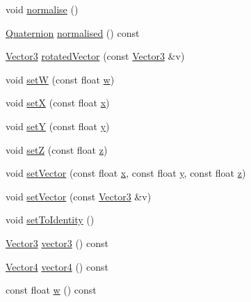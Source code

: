\begin{DoxyCompactItemize}
\item 
void \hyperlink{classprism_1_1_quaternion_adce2473719f015c5e8def79cacf4a37c}{normalise} ()
\item 
\hyperlink{classprism_1_1_quaternion}{Quaternion} \hyperlink{classprism_1_1_quaternion_ac9e4890f0614242dbcf2162b23dc483c}{normalised} () const 
\item 
\hyperlink{classprism_1_1_vector3}{Vector3} \hyperlink{classprism_1_1_quaternion_a042b07658410ce868af8ede1cab913b7}{rotated\+Vector} (const \hyperlink{classprism_1_1_vector3}{Vector3} \&v)
\item 
void \hyperlink{classprism_1_1_quaternion_ae639779c2c76874f1d2b3f04aa93f103}{setW} (const float \hyperlink{classprism_1_1_quaternion_aa930b57c8fbba2855722e82080a23cce}{w})
\item 
void \hyperlink{classprism_1_1_quaternion_a66751ee34eab5f4c77e51c018a0001ff}{setX} (const float \hyperlink{classprism_1_1_quaternion_ab3f80fc41a933a371b2861363997ce22}{x})
\item 
void \hyperlink{classprism_1_1_quaternion_ab3db803a8e07017514050bd550ea3e70}{setY} (const float \hyperlink{classprism_1_1_quaternion_a37023ce86684cb19287ec52cf27072f7}{y})
\item 
void \hyperlink{classprism_1_1_quaternion_a92e76b72fd75a6671431f0a2de2a6af2}{setZ} (const float \hyperlink{classprism_1_1_quaternion_a8af7b070028c48f61d1a76b1b49cbaac}{z})
\item 
void \hyperlink{classprism_1_1_quaternion_aabc3e1fd8b643857d206469980b4dff9}{set\+Vector} (const float \hyperlink{classprism_1_1_quaternion_ab3f80fc41a933a371b2861363997ce22}{x}, const float \hyperlink{classprism_1_1_quaternion_a37023ce86684cb19287ec52cf27072f7}{y}, const float \hyperlink{classprism_1_1_quaternion_a8af7b070028c48f61d1a76b1b49cbaac}{z})
\item 
void \hyperlink{classprism_1_1_quaternion_a2a3e3eefffb49c99b6d70d5d299b70e8}{set\+Vector} (const \hyperlink{classprism_1_1_vector3}{Vector3} \&v)
\item 
void \hyperlink{classprism_1_1_quaternion_a008a684b930b6e66f19317696fa47d71}{set\+To\+Identity} ()
\item 
\hyperlink{classprism_1_1_vector3}{Vector3} \hyperlink{classprism_1_1_quaternion_af6ca1a6e1e008c4ad06e2a1306a1edc6}{vector3} () const 
\item 
\hyperlink{classprism_1_1_vector4}{Vector4} \hyperlink{classprism_1_1_quaternion_af0d5601930898339edbfcc2f2d55bb4f}{vector4} () const 
\item 
const float \hyperlink{classprism_1_1_quaternion_aa930b57c8fbba2855722e82080a23cce}{w} () const 

\end{DoxyCompactItemize}
